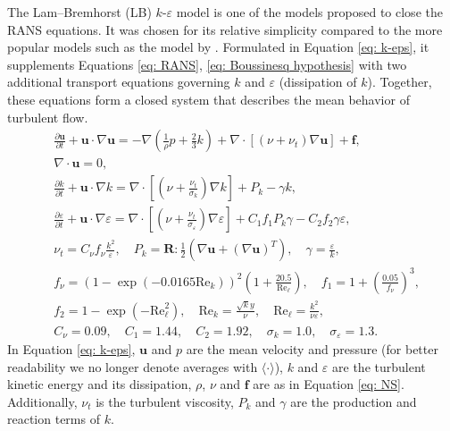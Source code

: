 The Lam--Bremhorst (LB) \(k\)-\(\varepsilon\) model \citep{lam_modified_1981} is one of the models proposed to close the RANS equations. It was chosen for its relative simplicity compared to the more popular models such as the model by \cite{launder_application_1974}. Formulated in Equation \eqref{eq: k-eps}, it supplements Equations \eqref{eq: RANS}, \eqref{eq: Boussinesq hypothesis} with two additional transport equations governing \(k\) and \(\varepsilon\) (dissipation of \(k\)). Together, these equations form a closed system that describes the mean behavior of turbulent flow.
\begin{equation}\label{eq: k-eps}
    \begin{split}
        &\frac{\partial \mathbf{u}}{\partial t} 
        + \mathbf{u} \cdot \nabla{\mathbf{u}}
        = 
        - \nabla{\left( \frac{1}{\rho}p + \frac{2}{3}k \right)}
        + \nabla \cdot \left[ (\nu + \nu_t) \nabla \mathbf{u} \right]
        + \mathbf{f},
        \\
        &\nabla \cdot \mathbf{u}
        = 0,
        \\
        &\frac{\partial k}{\partial t} 
        + \mathbf{u} \cdot \nabla{k}
        = \nabla \cdot \left[\left(\nu + \frac{\nu_t}{\sigma_k}\right) \nabla{k} \right]
        + P_k
        - \gamma k,
        \\
        &\frac{\partial \varepsilon}{\partial t} 
        + \mathbf{u} \cdot \nabla{\varepsilon}
        = \nabla \cdot \left[\left(\nu + \frac{\nu_t}{\sigma_\varepsilon}\right) \nabla{\varepsilon}\right]
        + C_1 f_1 P_k \gamma
        - C_2 f_2 \gamma \varepsilon,
        \\
        &\nu_t
        = C_\nu f_\nu \frac{k^2}{\varepsilon},
        \quad 
        P_k 
        = \mathbf{R} : \frac{1}{2} \left(\nabla{\mathbf{u}} + (\nabla{\mathbf{u}})^T\right),
        \quad
        \gamma
        = \frac{\varepsilon}{k},
        \\
        &f_\nu
        = (1 - \exp{\left( -0.0165 \text{Re}_k \right)})^2 \left(1 + \frac{20.5}{\text{Re}_\ell}\right),
        \quad
        f_1
        = 1 + \left( \frac{0.05}{f_\nu}\right)^3,
        \\
        &f_2 
        = 1 - \exp{\left(-\text{Re}_\ell^2\right)},
        \quad
        \text{Re}_k 
        = \frac{\sqrt{k} y}{\nu}, 
        \quad
        \text{Re}_\ell
        = \frac{k^2}{\nu \varepsilon},
        \\
        &C_\nu = 0.09, \quad
        C_1 = 1.44, \quad
        C_2 = 1.92, \quad
        \sigma_k = 1.0, \quad
        \sigma_\varepsilon = 1.3.
    \end{split}
\end{equation}
In Equation \eqref{eq: k-eps}, \(\mathbf{u}\) and \(p\) are the mean velocity and pressure (for better readability we no longer denote averages with \(\langle \cdot \rangle\)), \(k\) and \(\varepsilon\) are the turbulent kinetic energy and its dissipation, \(\rho\), \(\nu\) and \(\mathbf{f}\) are as in Equation \eqref{eq: NS}. Additionally, \(\nu_t\) is the turbulent viscosity, \(P_k\) and \(\gamma\) are the production and reaction terms of \(k\). 

